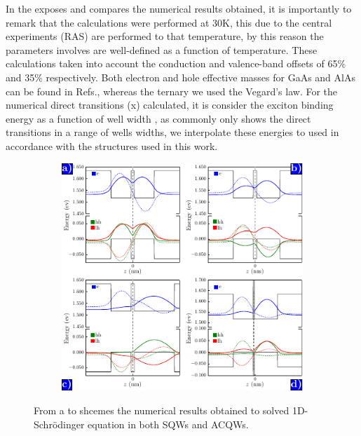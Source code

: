 In the  exposes and compares the numerical results obtained, it is importantly to remark that the calculations were performed at 30K, this due to the central experiments (RAS) are performed to that temperature, by this reason the parameters involves are well-defined as a function of temperature. These calculations taken into account the conduction and valence-band offsets of 65\% and 35\% respectively. Both electron and hole effective masses for GaAs and AlAs can be found in Refs.\cite{vurgaftman2001bandparameters,molenk1988determination,adachi2009properties}, whereas the ternary \algaas we used the Vegard's law\cite{donmez2012study}. For the numerical direct transitions (\gls{x}) calculated, it is consider the exciton binding energy as a function of well width \cite{yutaka1994theeffect,greene1984energylevels}, as commonly  only shows the direct transitions in a range of wells widths, we interpolate these energies to  used in accordance with the structures used in  this work. 

\begin{figure}[ht!]
	\centering
	\begin{subfigure}{\textwidth}
	\includegraphics[width=\textwidth]{../figures/chapter-2/numerical-calculations/out/numerical-results}
	\label{subfig:chapter-2-sec-numerical-results-a}
	\label{subfig:chapter-2-sec-numerical-results-b}
	\label{subfig:chapter-2-sec-numerical-results-c}
	\label{subfig:chapter-2-sec-numerical-results-d}
	\end{subfigure}
	\caption{From  a to  shcemes the numerical results obtained to solved 1D-Schrödinger equation in both SQWs and ACQWs. }
	\label{fig:chapter-2-sec-numerical-calculations-results}
\end{figure} 

